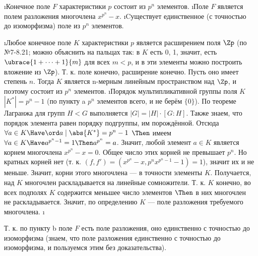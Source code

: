 \begin{problem}
\begin{enumerate}[label=\asbuk{enumi})]
\i Конечное поле $F$ характеристики $p$ состоит из $p^n$ элементов. 
\i Поле $F$ является полем разложения многочлена $x^{p^n}-x$. 
\i Cуществует единственное (с точностью до изоморфизма) поле из $p^n$ элементов.
\end{enumerate}
\end{problem}
\begin{solution}
\begin{enumerate}[label=\asbuk{enumi})]
\i Любое конечное поле \(K\) характеристики $p$ является расширением поля \(\Zp\) (по №7-8.21; можно объяснить на пальцах так: в $K$ есть 0, 1, значит, есть $\ubrace{1+\dots+1}{m}$ для всех $m<p$, и в эти элементы можно построить вложение из $\Zp$). Т. к. поле конечно, расширение конечно. Пусть оно имеет степень $n$. Тогда \(K\) является n-мерным линейным пространством над \(\Zp\), и поэтому состоит из \(p^n\) элементов.
\i Порядок мультипликативной группы поля $K$ $|K^*|=p^n-1$ (по пункту a $p^n$ элементов всего, и не берём $\{0\}$). По теореме Лагранжа для групп $H < G$ выполняется $|G| = |H| \cdot [G:H]$. Также знаем, что порядок элемента равен порядку подгруппы, им порождённой. Отсюда $\forall a \in K \Have \ord a \mid \abs{K^*}=p^n-1$ $\Then$ имеем $\forall a \in K \Have a^{p^n-1}=1 \Then a^{p^n}=a$. Значит, любой элемент $a \in K$ является корнем многочлена $x^{p^n}-x=0$. Общее число этих корней не превышает $p^n$. Но кратных корней нет (т. к. $(f, f') = (x^{p^n}-x, p^nx^{p^n-1}-1) = 1$), значит их и не меньше. Значит, корни этого многочлена --- в точности элементы $K$. Получается, над $K$ многочлен раскладывается на линейные сомножители. Т. к. $K$ конечно, во всех подполях $K$ содержится меньшее число элементов $\Then$ в них многочлен не раскладывается. Значит, по определению $K$ --- поле разложения требуемого многочлена.
\i 
	
	Т. к. по пункту b поле $F$ есть поле разложения, оно единственно с точностью до изоморфизма (знаем, что поле разложения единственно с точностью до изоморфизма, и пользуемся этим без доказательства).
\end{enumerate}
\end{solution}

